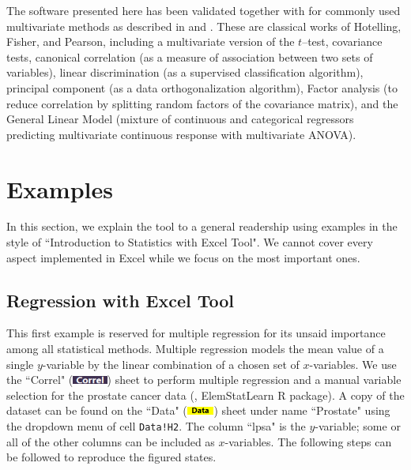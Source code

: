 \documentclass[article]{jss}
\newcommand{\shtData}{``Data" (\includegraphics[height=8pt, keepaspectratio=true]{DataSheetTab_png}) }
\newcommand{\shtCorrel}{``Correl" (\includegraphics[height=8pt, keepaspectratio=true]{CorrelSheetTab_png}) }
\begin{document}
  
        The software presented here has been validated together with  for commonly used multivariate methods as described in \cite{anderson2003introMVA3e} and \cite{johnson1992applied}. These are classical works of Hotelling, Fisher, and Pearson, including a multivariate version of the  $t$--test, covariance tests, canonical correlation (as a measure of association between two sets of variables), linear discrimination (as a supervised classification algorithm),  principal component (as a data orthogonalization algorithm), Factor analysis (to reduce correlation by splitting random factors of the covariance matrix), and the General Linear Model (mixture of continuous and categorical regressors predicting multivariate continuous response with multivariate ANOVA).
  
  
        \section[example]{Examples}        
            In this section, we explain the tool to a general readership using examples in the style of ``Introduction to Statistics with Excel Tool". We cannot cover every aspect implemented in Excel while we focus on the most important ones.
                
        \subsection[egReg]{Regression with Excel Tool}
        This first example is reserved for multiple regression for its unsaid importance among all statistical methods. 
        Multiple regression models the mean value of a single $y$-variable by the linear combination of a chosen set of $x$-variables. 
        We use the \shtCorrel sheet to perform multiple regression and a manual variable selection for the prostate cancer data (\cite{stamey1989prostate}, ElemStatLearn R package). 
        A copy of the dataset can be found on the \shtData sheet under name ``Prostate" using the dropdown menu of cell \texttt{Data!H2}. 
        The column ``lpsa" is the $y$-variable; some or all of the other columns can be included as $x$-variables.
	    The following steps can be followed to reproduce the figured states.
	    
\end{document}
